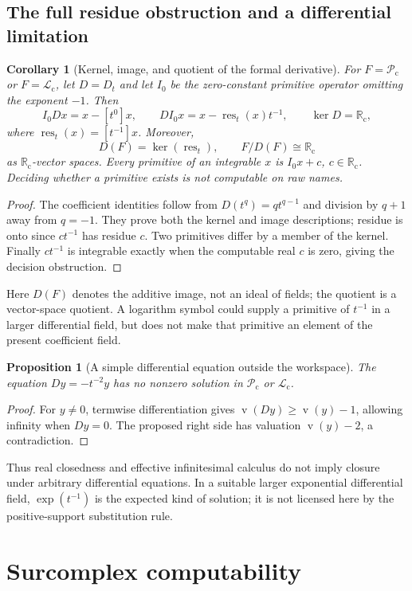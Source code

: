 \documentclass[11pt,letterpaper]{article}
\numberwithin{equation}{section}
\newtheorem{proposition}[theorem]{Proposition}
\newtheorem{corollary}[theorem]{Corollary}
\theoremstyle{definition}
\theoremstyle{remark}
\newcommand{\Rc}{\mathbb R_{\mathrm c}}
\newcommand{\Lc}{\mathcal L_{\mathrm c}}
\newcommand{\Pc}{\mathcal P_{\mathrm c}}
\newcommand{\res}{\operatorname{res}}
\newcommand{\val}{\operatorname{v}}
\begin{document}
\subsection{The full residue obstruction and a differential limitation}
\begin{corollary}[Kernel, image, and quotient of the formal derivative]
\label{cor:differential-quotient}
For $F=\Pc$ or $F=\Lc$, let $D=D_t$ and let $I_0$ be the zero-constant
primitive operator omitting the exponent $-1$. Then
\[
 I_0Dx=x-[t^0]x,\qquad DI_0x=x-\res_t(x)t^{-1},\qquad
 \ker D=\Rc,
\]
where $\res_t(x)=[t^{-1}]x$. Moreover,
\[
 D(F)=\ker(\res_t),\qquad F/D(F)\cong\Rc
\]
as $\Rc$-vector spaces. Every primitive of an integrable $x$ is $I_0x+c$,
$c\in\Rc$. Deciding whether a primitive exists is not computable on raw names.
\end{corollary}
\begin{proof}
The coefficient identities follow from $D(t^q)=qt^{q-1}$ and division by
$q+1$ away from $q=-1$. They prove both the kernel and image descriptions;
residue is onto since $ct^{-1}$ has residue $c$. Two primitives differ by
a member of the kernel. Finally $ct^{-1}$ is integrable exactly when the
computable real $c$ is zero, giving the decision obstruction.
\end{proof}
Here $D(F)$ denotes the additive image, not an ideal of fields; the quotient
is a vector-space quotient. A logarithm symbol could supply a primitive of
$t^{-1}$ in a larger differential field, but does not make that primitive
an element of the present coefficient field.

\begin{proposition}[A simple differential equation outside the workspace]
\label{prop:ode-obstruction}
The equation $Dy=-t^{-2}y$ has no nonzero solution in $\Pc$ or $\Lc$.
\end{proposition}
\begin{proof}
For $y\ne0$, termwise differentiation gives
$\val(Dy)\ge\val(y)-1$, allowing infinity when $Dy=0$.
The proposed right side has valuation $\val(y)-2$, a contradiction.
\end{proof}
Thus real closedness and effective infinitesimal calculus do not imply
closure under arbitrary differential equations. In a suitable larger
exponential differential field, $\exp(t^{-1})$ is the expected kind of
solution; it is not licensed here by the positive-support substitution rule.


\section{Surcomplex computability}
\label{sec:surcomplex}
\end{document}
